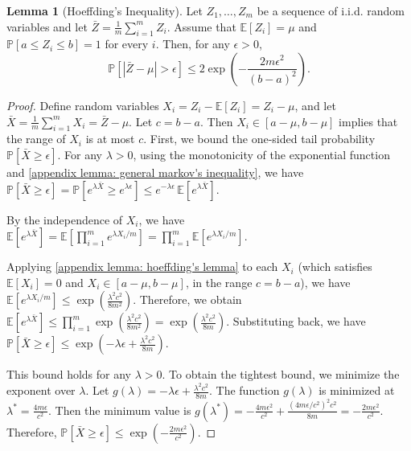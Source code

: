 \documentclass[openany, amssymb, psamsfonts]{amsart}
\theoremstyle{definition}
\numberwithin{equation}{section}
\newtheorem{appendixlemma}{Lemma}
\begin{document}
\begin{appendixlemma}[Hoeffding's Inequality]\label{appendix lemma: hoeffding's inequality}
Let $Z_1, \ldots, Z_m$ be a sequence of i.i.d. random variables and let $\bar{Z} = \frac{1}{m} \sum_{i=1}^m Z_i$. Assume that $\mathbb{E}[Z_i] = \mu$ and $\mathbb{P}[a \leq Z_i \leq b] = 1$ for every $i$. Then, for any $\epsilon > 0$,
\[\mathbb{P} [ \left| \bar{Z} - \mu \right| > \epsilon ] \leq 2 \exp \left( -\frac{2m\epsilon^2}{(b-a)^2} \right).\]
\end{appendixlemma}
\begin{proof}
Define random variables $X_i = Z_i - \mathbb{E}\left[Z_i\right] = Z_i - \mu$, and let $\bar{X} = \tfrac{1}{m} \sum_{i=1}^m X_i = \bar{Z} - \mu$. Let $c = b - a$. Then $X_i \in [a - \mu, b - \mu]$ implies that the range of $X_i$ is at most $c$.
First, we bound the one-sided tail probability $\mathbb{P}\left[\bar{X} \geq \epsilon\right]$. For any $\lambda > 0$, using the monotonicity of the exponential function and \autoref{appendix lemma: general markov's inequality}, we have $\mathbb{P}\left[\bar{X} \geq \epsilon\right] = \mathbb{P}\left[e^{\lambda \bar{X}} \geq e^{\lambda \epsilon}\right] \leq e^{-\lambda \epsilon} \, \mathbb{E}\left[e^{\lambda \bar{X}}\right]$.

By the independence of $X_i$, we have $\mathbb{E}\left[e^{\lambda \bar{X}}\right] = \mathbb{E} \left[ \prod_{i=1}^m e^{\lambda X_i / m} \right] = \prod_{i=1}^m \mathbb{E}\left[e^{\lambda X_i / m}\right]$.

Applying \autoref{appendix lemma: hoeffding's lemma} to each $X_i$ (which satisfies $\mathbb{E}\left[X_i\right] = 0$ and $X_i \in [a - \mu, b - \mu]$, in the range $c = b - a$), we have $\mathbb{E}\left[e^{\lambda X_i / m}\right] \leq \exp \!\left( \tfrac{\lambda^2 c^2}{8 m^2} \right)$.
Therefore, we obtain $\mathbb{E}\left[e^{\lambda \bar{X}}\right] \leq \prod_{i=1}^m \exp \!\left( \tfrac{\lambda^2 c^2}{8 m^2} \right) = \exp \!\left( \tfrac{\lambda^2 c^2}{8 m} \right)$.
Substituting back, we have $\mathbb{P}\left[\bar{X} \geq \epsilon\right] \leq \exp \!\left( -\lambda \epsilon + \tfrac{\lambda^2 c^2}{8 m} \right)$.

This bound holds for any $\lambda > 0$. To obtain the tightest bound, we minimize the exponent over $\lambda$. Let $g(\lambda) = -\lambda \epsilon + \tfrac{\lambda^2 c^2}{8 m}$.  
The function $g(\lambda)$ is minimized at $\lambda^* = \tfrac{4 m \epsilon}{c^2}$.  
Then the minimum value is $g(\lambda^*) = -\tfrac{4 m \epsilon^2}{c^2} + \tfrac{(4 m \epsilon / c^2)^2 c^2}{8 m} = -\tfrac{2 m \epsilon^2}{c^2}$.  
Therefore, $\mathbb{P}\left[\bar{X} \geq \epsilon\right] \leq \exp \!\left( -\tfrac{2 m \epsilon^2}{c^2} \right)$.


\end{proof}
\end{document}
